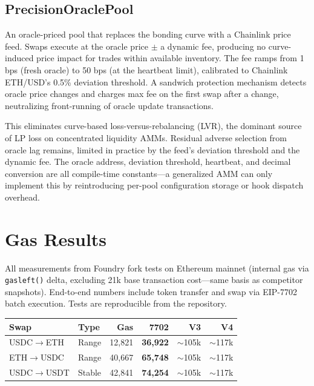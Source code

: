 \documentclass[10pt,twocolumn]{article}
\begin{document}
\subsection{PrecisionOraclePool}

An oracle-priced pool that replaces the bonding curve with a Chainlink price feed. Swaps execute at the oracle price $\pm$ a dynamic fee, producing no curve-induced price impact for trades within available inventory. The fee ramps from 1 bps (fresh oracle) to 50 bps (at the heartbeat limit), calibrated to Chainlink ETH/USD's 0.5\% deviation threshold. A sandwich protection mechanism detects oracle price changes and charges max fee on the first swap after a change, neutralizing front-running of oracle update transactions.

This eliminates curve-based loss-versus-rebalancing (LVR), the dominant source of LP loss on concentrated liquidity AMMs. Residual adverse selection from oracle lag remains, limited in practice by the feed's deviation threshold and the dynamic fee. The oracle address, deviation threshold, heartbeat, and decimal conversion are all compile-time constants---a generalized AMM can only implement this by reintroducing per-pool configuration storage or hook dispatch overhead.

\section{Gas Results}

All measurements from Foundry fork tests on Ethereum mainnet (internal gas via \texttt{gasleft()} delta, excluding 21k base transaction cost---same basis as competitor snapshots). End-to-end numbers include token transfer and swap via EIP-7702 batch execution. Tests are reproducible from the repository.

\begin{table}[h]
\centering
\small
\begin{tabular}{@{}llrrrr@{}}
\toprule
Swap & Type & Gas & 7702 & V3 & V4 \\
\midrule
USDC$\to$ETH & Range & 12,821 & \textbf{36,922} & ${\sim}$105k & ${\sim}$117k \\
ETH$\to$USDC & Range & 40,667 & \textbf{65,748} & ${\sim}$105k & ${\sim}$117k \\
USDC$\to$USDT & Stable & 42,841 & \textbf{74,254} & ${\sim}$105k & ${\sim}$117k \\
\bottomrule
\end{tabular}
\end{table}
\end{document}
